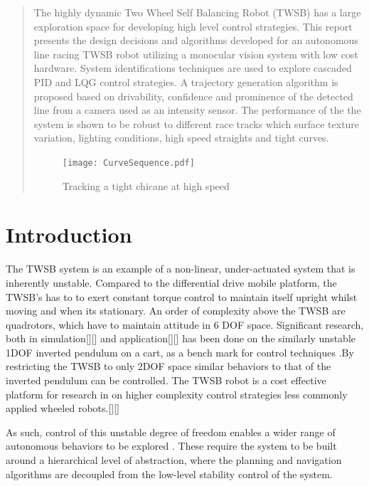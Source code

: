     \begin{abstract} %
    The highly dynamic Two Wheel Self Balancing Robot 
    (TWSB) has a large exploration space for developing high level 
    control strategies. 
    This report presents the design decisions and algorithms developed for
    an autonomous line racing TWSB robot utilizing a monocular vision system with low cost hardware. 
    System identifications techniques are used to explore
    cascaded PID and LQG control strategies.
    A trajectory generation algorithm is proposed based on drivability, confidence 
    and prominence of the detected line from a camera used as an intensity sensor. 
    The performance of the the system is shown to be robust to different race tracks which
    surface texture variation, lighting conditions, high speed straights and tight curves. 

    \begin{figure}[H]
    \centering
    \texttt{[image: CurveSequence.pdf]}
    \caption{Tracking a tight chicane at high speed}
    \end{figure}

  \end{abstract}%
  \clearpage
    \section{Introduction}
    The TWSB system is an example of a non-linear, under-actuated system that is inherently unstable.
    Compared to the differential drive mobile platform, the TWSB's has to to exert constant torque 
    control to maintain itself upright whilst moving and when its stationary. An order of complexity 
    above the TWSB are quadrotors, which have to maintain attitude in 6 DOF space.  
    Significant research, both in simulation[][] and application[][]
    has been done on the similarly unstable 1DOF inverted pendulum on a cart, as a bench mark 
    for control techniques \cite{boubaker2013inverted}.By restricting the TWSB to 
    only 2DOF space similar behaviors to that of the inverted pendulum can be controlled.
    The TWSB robot is a cost effective platform for research in on higher complexity control strategies 
    less commonly applied wheeled robots.[][] 

    As such, control of this unstable degree of freedom enables a wider range 
    of autonomous behaviors to be explored \cite{RoboLimbo} \cite{jeong2008wheeled} \cite{Browning2004TurningSI}. 
    These require the system to be built around a hierarchical level of abstraction, 
    where the planning and navigation algorithms are decoupled from the low-level stability control of the system.

